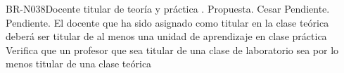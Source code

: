 \begin{BusinessRule}{BR-N038}{Docente titular de teoría y práctica}
	{\bcCondition}    %
	{\btEnabler}     %
	{\blControlling}    %
	.
	\BRItem[Estado] Propuesta.
	 Cesar
	 Pendiente.
	 Pendiente.
	\BRItem[Descripción] El docente que ha sido asignado como titular en la clase teórica deberá ser titular de al menos una unidad de aprendizaje en clase práctica
	\BRItem[Motivación] Verifica que un profesor que sea titular de una clase de laboratorio sea por lo menos titular de una clase teórica
\end{BusinessRule}

